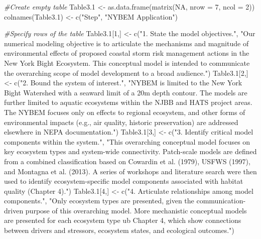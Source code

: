 \documentclass[
]{book}
\newenvironment{Shaded}{\begin{snugshade}}{\end{snugshade}}
\newcommand{\AttributeTok}[1]{\textcolor[rgb]{0.77,0.63,0.00}{#1}}
\newcommand{\CommentTok}[1]{\textcolor[rgb]{0.56,0.35,0.01}{\textit{#1}}}
\newcommand{\ConstantTok}[1]{\textcolor[rgb]{0.00,0.00,0.00}{#1}}
\newcommand{\DecValTok}[1]{\textcolor[rgb]{0.00,0.00,0.81}{#1}}
\newcommand{\FloatTok}[1]{\textcolor[rgb]{0.00,0.00,0.81}{#1}}
\newcommand{\FunctionTok}[1]{\textcolor[rgb]{0.00,0.00,0.00}{#1}}
\newcommand{\NormalTok}[1]{#1}
\newcommand{\OtherTok}[1]{\textcolor[rgb]{0.56,0.35,0.01}{#1}}
\newcommand{\StringTok}[1]{\textcolor[rgb]{0.31,0.60,0.02}{#1}}
\begin{document}
\begin{Shaded}
\begin{Highlighting}[]
\CommentTok{\#Create empty table}
\NormalTok{Table3}\FloatTok{.1} \OtherTok{\textless{}{-}} \FunctionTok{as.data.frame}\NormalTok{(}\FunctionTok{matrix}\NormalTok{(}\ConstantTok{NA}\NormalTok{, }\AttributeTok{nrow =} \DecValTok{7}\NormalTok{, }\AttributeTok{ncol =} \DecValTok{2}\NormalTok{))}
\FunctionTok{colnames}\NormalTok{(Table3}\FloatTok{.1}\NormalTok{) }\OtherTok{\textless{}{-}} \FunctionTok{c}\NormalTok{(}\StringTok{"Step"}\NormalTok{, }\StringTok{"NYBEM Application"}\NormalTok{)}

\CommentTok{\#Specify rows of the table}
\NormalTok{Table3}\FloatTok{.1}\NormalTok{[}\DecValTok{1}\NormalTok{,] }\OtherTok{\textless{}{-}} \FunctionTok{c}\NormalTok{(}\StringTok{"1. State the model objectives."}\NormalTok{, }\StringTok{"Our numerical modeling objective is to articulate the mechanisms and magnitude of environmental effects of proposed coastal storm risk management actions in the New York Bight Ecosystem. This conceptual model is intended to communicate the overarching scope of model development to a broad audience."}\NormalTok{)}
\NormalTok{Table3}\FloatTok{.1}\NormalTok{[}\DecValTok{2}\NormalTok{,] }\OtherTok{\textless{}{-}} \FunctionTok{c}\NormalTok{(}\StringTok{"2. Bound the system of interest."}\NormalTok{, }\StringTok{"NYBEM is limited to the New York Bight Watershed with a seaward limit of a 20m depth contour. The models are further limited to aquatic ecosystems within the NJBB and HATS project areas. The NYBEM focuses only on effects to regional ecosystem, and other forms of environmental impacts (e.g., air quality, historic preservation) are addressed elsewhere in NEPA documentation."}\NormalTok{)}
\NormalTok{Table3}\FloatTok{.1}\NormalTok{[}\DecValTok{3}\NormalTok{,] }\OtherTok{\textless{}{-}} \FunctionTok{c}\NormalTok{(}\StringTok{"3. Identify critical model components within the system."}\NormalTok{, }\StringTok{"This overarching conceptual model focuses on key ecosystem types and system{-}wide connectivity. Patch{-}scale models are defined from a combined classification based on Cowardin et al. (1979), USFWS (1997), and Montagna et al. (2013). A series of workshops and literature search were then used to identify ecosystem{-}specific model components associated with habitat quality (Chapter 4)."}\NormalTok{)}
\NormalTok{Table3}\FloatTok{.1}\NormalTok{[}\DecValTok{4}\NormalTok{,] }\OtherTok{\textless{}{-}} \FunctionTok{c}\NormalTok{(}\StringTok{"4. Articulate relationships among model components."}\NormalTok{, }\StringTok{"Only ecosystem types are presented, given the communication{-}driven purpose of this overarching model. More mechanistic conceptual models are presented for each ecosystem type ub Chapter 4, which show connections between drivers and stressors, ecosystem states, and ecological outcomes."}\NormalTok{)}

\end{Highlighting}
\end{Shaded}
\end{document}
